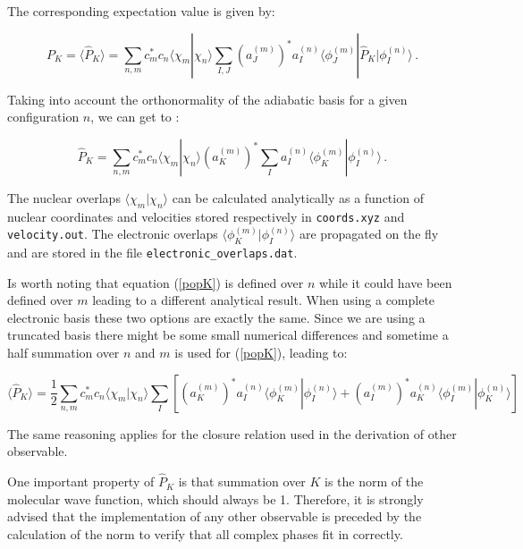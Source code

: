 The corresponding expectation value is given by:

\begin{equation}
    P_K = \langle\hat P_K\rangle = \sum_{n,m}c_m^*c_n\langle\chi_m|\chi_n\rangle\sum_{I,J}\left(a_J^{(m)}\right)^*a_I^{(n)}\langle\phi_J^{(m)}|\hat P_K|\phi_I^{(n)}\rangle\,.
\end{equation}

Taking into account the orthonormality of the adiabatic basis for a given configuration $n$, we can get to \cite{freixas2018ab}:

\begin{equation}
    \hat P_K = \sum_{n,m}c_m^*c_n\langle\chi_m|\chi_n\rangle\left(a_K^{(m)}\right)^*\sum_{I}a_I^{(n)}\langle\phi_K^{(m)}|\phi_I^{(n)}\rangle\,.
\end{equation}

The nuclear overlaps $\langle\chi_m|\chi_n\rangle$ can be calculated analytically \cite{makhov2014ab} as a function of nuclear coordinates and velocities stored respectively in \verb+coords.xyz+ and \verb+velocity.out+. The electronic overlaps $\langle\phi_K^{(m)}|\phi_I^{(n)}\rangle$ are propagated on the fly \cite{freixas2018ab} and are stored in the file \verb+electronic_overlaps.dat+.

Is worth noting that equation (\ref{popK}) is defined over $n$ while it could have been defined over $m$ leading to a different analytical result. When using a complete electronic basis these two options are exactly the same. Since we are using a truncated basis there might be some small numerical differences and sometime a half summation over $n$ and $m$ is used for (\ref{popK}), leading to:

\begin{equation}
    \langle\hat P_{K}\rangle = \frac{1}{2}\sum_{n,m}c_m^*c_n\langle\chi_m|\chi_n\rangle\sum_{I}\left[\left(a_K^{(m)}\right)^*a_I^{(n)}\langle\phi_K^{(m)}|\phi_I^{(n)}\rangle+\left(a_I^{(m)}\right)^*a_K^{(n)}\langle\phi_I^{(m)}|\phi_K^{(n)}\rangle\right]
\end{equation}

The same reasoning applies for the closure relation used in the derivation of other observable.

One important property of $\hat P_K$ is that summation over $K$ is the norm of the molecular wave function, which should always be 1. Therefore, it is strongly advised that the implementation of any other observable is preceded by the calculation of the norm to verify that all complex phases fit in correctly.

